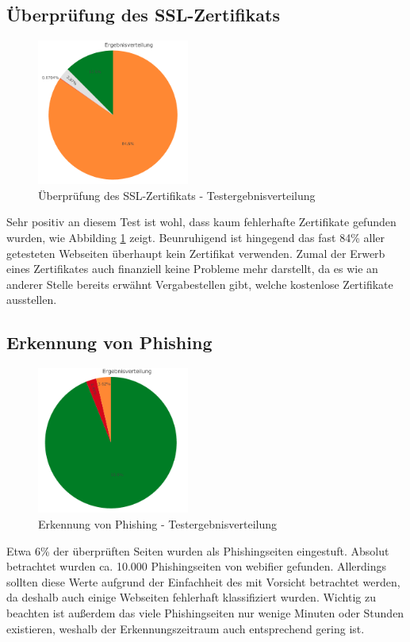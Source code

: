 \subsection{Überprüfung des SSL-Zertifikats}
\begin{figure}[H]
  \centering
  \includegraphics[width=5cm]{images/stats/diacertificate}
  \caption{Überprüfung des SSL-Zertifikats - Testergebnisverteilung}
  \label{fig:analyse-diacertificate}
\end{figure}

Sehr positiv an diesem Test ist wohl, dass kaum fehlerhafte Zertifikate gefunden wurden, wie Abbilding \ref{fig:analyse-diacertificate} zeigt. Beunruhigend ist hingegend das fast 84\% aller getesteten Webseiten überhaupt kein Zertifikat verwenden. Zumal der Erwerb eines Zertifikates auch finanziell keine Probleme mehr darstellt, da es wie an anderer Stelle bereits erwähnt Vergabestellen gibt, welche kostenlose Zertifikate ausstellen.

\subsection{Erkennung von Phishing}
\begin{figure}[H]
  \centering
  \includegraphics[width=5cm]{images/stats/diaphishing}
  \caption{Erkennung von Phishing - Testergebnisverteilung}
  \label{fig:analyse-diaphishing}
\end{figure}

Etwa 6\% der überprüften Seiten wurden als Phishingseiten eingestuft. Absolut betrachtet wurden ca. 10.000 Phishingseiten von webifier gefunden. Allerdings sollten diese Werte aufgrund der Einfachheit des mit Vorsicht betrachtet werden, da deshalb auch einige Webseiten fehlerhaft klassifiziert wurden. Wichtig zu beachten ist außerdem das viele Phishingseiten nur wenige Minuten oder Stunden existieren, weshalb der Erkennungszeitraum auch entsprechend gering ist.

